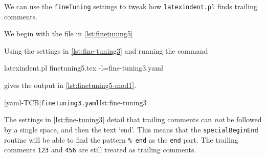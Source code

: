  \begin{example}
 We can use the \texttt{fineTuning} settings to tweak how \texttt{latexindent.pl} finds
 trailing comments. 

 We begin with the file in \cref{lst:finetuning5}


 Using the settings in \cref{lst:fine-tuning3} and running the command

 \begin{commandshell}
latexindent.pl finetuning5.tex -l=fine-tuning3.yaml
\end{commandshell}

 gives the output in \cref{lst:finetuning5-mod1}.

 \begin{cmhtcbraster}[raster column skip=.01\linewidth]
  [yaml-TCB]{\texttt{finetuning3.yaml}}{lst:fine-tuning3}
 \end{cmhtcbraster}

 The settings in \cref{lst:fine-tuning3} detail that trailing comments can \emph{not} be
 followed by a single space, and then the text `end'. This means that the
 \texttt{specialBeginEnd} routine will be able to find the pattern \lstinline!% end! as
 the \texttt{end} part. The trailing comments \texttt{123} and \texttt{456} are still
 treated as trailing comments.
 \end{example}

